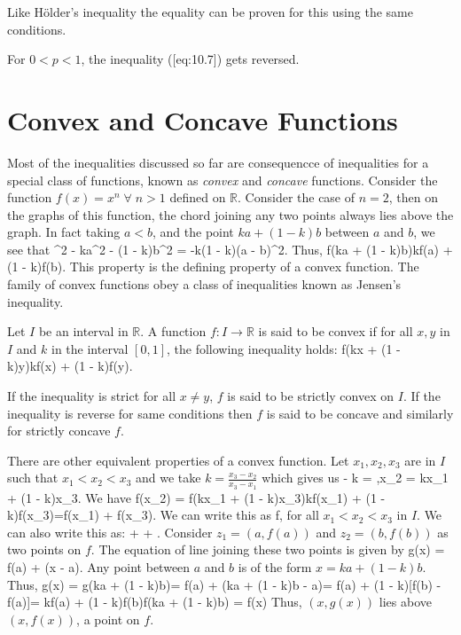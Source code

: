   Like H\"{o}lder's inequality the equality can be proven for this using the same conditions.
\stopproof

\startremark
\stopremark For $0<p<1$, the inequality ([eq:10.7]) gets reversed.

\section{Convex and Concave Functions}
Most of the inequalities discussed so far are consequencce of inequalities for a special class of functions, known as
{\it convex} and {\it concave} functions. Consider the function $f(x) = x^n\;\forall\;n>1$ defined on $\mathbb{R}$. Consider
the case of $n=2$, then on the graphs of this function, the chord joining any two points always lies above the graph. In fact
taking $a<b$, and the point $ka + (1 - k)b$ between $a$ and $b$, we see that
\startformula [ka + (1 - k)b]^2 - ka^2 - (1 - k)b^2 = -k(1 - k)(a - b)^2.\stopformula
Thus,
\startformula f(ka + (1 - k)b)\leq kf(a) + (1 - k)f(b).\stopformula
This property is the defining property of a convex function. The family of convex functions obey a class of inequalities known as
Jensen's inequality.

Let $I$ be an interval in $\mathbb{R}$. A function $f:I\rightarrow\mathbb{R}$ is said to be convex if for all $x, y$ in $I$ and
$k$ in the interval $[0, 1]$, the following inequality holds:
\placeformula[eq:convex]\startformula
  f(kx + (1 - k)y)\leq kf(x) + (1 - k)f(y).
\stopformula

If the inequality is strict for all $x\neq y$, $f$ is said to be strictly convex on $I$. If the inequality is reverse for same
conditions then $f$ is said to be concave and similarly for strictly concave $f$.

There are other equivalent properties of a convex function. Let $x_1, x_2, x_3$ are in $I$ such that $x_1<x_2<x_3$ and we take $k =
\frac{x_3 - x_2}{x_3 - x_1}$ which gives us
 - k = ,\;\;x_2 = kx_1 + (1 - k)x_3.\stopformula
We have \startformula \startalign\NC f(x_2) \NC= f(kx_1 + (1 - k)x_3)\NR\NC\NC\leq kf(x_1) + (1 - k)f(x_3)\NR\NC\NC=f(x_1) +
  f(x_3).\stopalign\stopformula
We can write this as \startformula f\leq{},\stopformula
for all $x_1<x_2<x_3$ in $I$. We can also write this as:
\startformula {} +  + .\stopformula
Consider $z_1 = (a, f(a))$ and $z_2 = (b, f(b))$ as two points on $f$. The equation of line joining these two points is given by
\startformula g(x) = f(a) + (x - a).\stopformula
Any point between $a$ and $b$ is of the form $x = ka + (1 - k)b$. Thus,
\startformula \startalign\NC g(x) \NC = g(ka + (1 - k)b)\NR\NC\NC = f(a) + (ka + (1 - k)b - a)\NR\NC\NC = f(a) + (1 - k)[f(b) -
    f(a)]\NR\NC\NC = kf(a) + (1 - k)f(b)\NR\NC\NC \geq f(ka + (1 - k)b) = f(x)\stopalign\stopformula
Thus, $(x, g(x))$ lies above $(x, f(x))$, a point on $f$.

